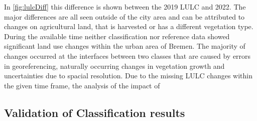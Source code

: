 \documentclass[12pt,a4paper, english,twoside]{scrartcl}
\begin{document}
      In \cref{fig:lulcDiff} this difference is shown between the 2019 \gls{LULC} and 2022.
      The major differences are all seen outside of the city area and can be attributed to changes on agricultural land, that is harvested or has a different vegetation type.
      During the available time neither classification nor reference data showed significant land use changes within the urban area of Bremen. 
      The majority of changes occurred at the interfaces between two classes that are caused by errors in georeferencing, naturally occurring changes in vegetation growth and uncertainties due to spacial resolution.
      Due to the missing \gls{LULC} changes within the given time frame, the analysis of the impact of 
      \newpage
    \subsection{Validation of Classification results}\label{sec:references}
      
\end{document}
